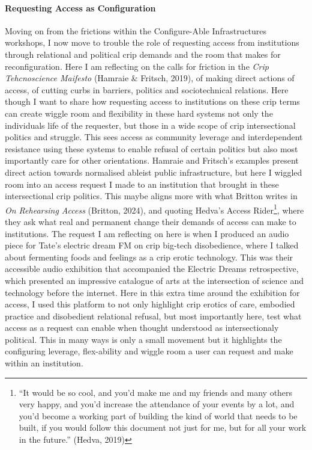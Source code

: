 \hypertarget{requesting-access-as-configuration}{%
\paragraph[Requesting Access as
Configuration]{\texorpdfstring{\protect\hypertarget{anchor}{}{}Requesting
Access as
Configuration}{Requesting Access as Configuration}}\label{requesting-access-as-configuration}}

Moving on from the frictions within the Configure-Able Infrastructures
workshops, I now move to trouble the role of requesting access from
institutions through relational and political crip demands and the room
that makes for reconfiguration. Here I am reflecting on the calls for
friction in the \emph{Crip Tehcnoscience Maifesto} (Hamraie \& Fritsch,
2019), of making direct actions of access, of cutting curbs in barriers,
politics and sociotechnical relations. Here though I want to share how
requesting access to institutions on these crip terms can create wiggle
room and flexibility in these hard systems not only the individuals life
of the requester, but those in a wide scope of crip intersectional
politics and struggle. This sees access as community leverage and
interdependent resistance using these systems to enable refusal of
certain politics but also most importantly care for other orientations.
Hamraie and Fritsch's examples present direct action towards normalised
ableist public infrastructure, but here I wiggled room into an access
request I made to an institution that brought in these intersectional
crip politics. This maybe aligns more with what Britton writes in
\emph{On Rehearsing Access} (Britton, 2024), and quoting Hedva's Access
Rider\footnote{``It would be so cool, and you'd make me and my friends
  and many others very happy, and you'd increase the attendance of your
  events by a lot, and you'd become a working part of building the kind
  of world that needs to be built, if you would follow this document not
  just for me, but for all your work in the future.'' (Hedva, 2019)},
where they ask what real and permanent change their demands of access
can make to institutions. The request I am reflecting on here is when I
produced an audio piece for Tate's electric dream FM on crip big-tech
disobedience, where I talked about fermenting foods and feelings as a
crip erotic technology. This was their accessible audio exhibition that
accompanied the Electric Dreams retrospective, which presented an
impressive catalogue of arts at the intersection of science and
technology before the internet. Here in this extra time around the
exhibition for access, I used this platform to not only highlight crip
erotics of care, embodied practice and disobedient relational refusal,
but most importantly here, test what access as a request can enable when
thought understood as intersectionaly political. This in many ways is
only a small movement but it highlights the configuring leverage,
flex-ability and wiggle room a user can request and make within an
institution.

